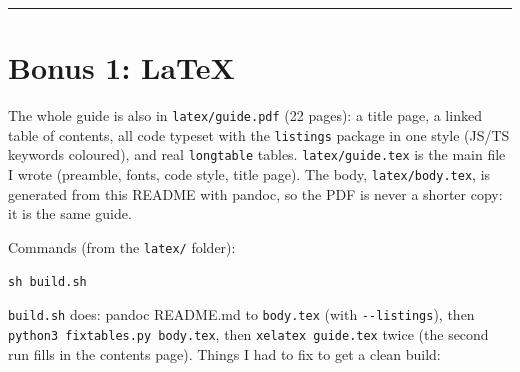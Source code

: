 \begin{center}\rule{0.5\linewidth}{0.5pt}\end{center}

\hypertarget{bonus-1-latex}{%
\section{Bonus 1: LaTeX}\label{bonus-1-latex}}

The whole guide is also in \passthrough{\lstinline!latex/guide.pdf!} (22 pages): a title page, a linked table of contents, all code typeset with the \passthrough{\lstinline!listings!} package in one style (JS/TS keywords coloured), and real \passthrough{\lstinline!longtable!} tables. \passthrough{\lstinline!latex/guide.tex!} is the main file I wrote (preamble, fonts, code style, title page). The body, \passthrough{\lstinline!latex/body.tex!}, is generated from this README with pandoc, so the PDF is never a shorter copy: it is the same guide.

Commands (from the \passthrough{\lstinline!latex/!} folder):

\begin{lstlisting}
sh build.sh
\end{lstlisting}

\passthrough{\lstinline!build.sh!} does: pandoc README.md to \passthrough{\lstinline!body.tex!} (with \passthrough{\lstinline!--listings!}), then \passthrough{\lstinline!python3 fixtables.py body.tex!}, then \passthrough{\lstinline!xelatex guide.tex!} twice (the second run fills in the contents page). Things I had to fix to get a clean build:

